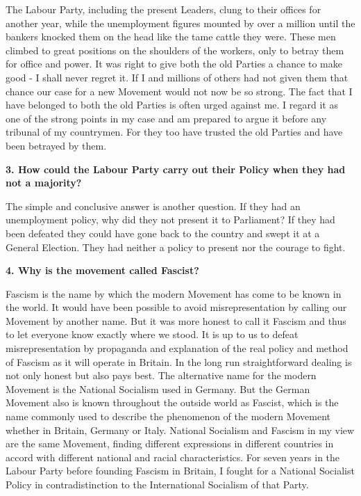 \documentclass{book}
\begin{document}
\begin{flushleft}
The Labour Party, including the present Leaders, clung to their offices for another year, while the
unemployment figures mounted by over a million until the bankers knocked them on the head
like the tame cattle they were. These men climbed to great positions on the shoulders of the
workers, only to betray them for office and power. It was right to give both the old Parties a
chance to make good - I shall never regret it. If I and millions of others had not given them that
chance our case for a new Movement would not now be so strong. The fact that I have belonged
to both the old Parties is often urged against me. I regard it as one of the strong points in my case
and am prepared to argue it before any tribunal of my countrymen. For they too have trusted the old Parties and have been betrayed by them.
\end{flushleft}

\begin{flushright}
\textbf{3. How could the Labour Party carry out their Policy
    when they had not a majority?}

The simple and conclusive answer is another question. If they had an unemployment policy, why
did they not present it to Parliament? If they had been defeated they could have gone back to the
country and swept it at a General Election. They had neither a policy to present nor the courage to fight.
\end{flushright}

\begin{flushleft}
\textbf{4. Why is the movement called Fascist?}

Fascism is the name by which the modern Movement has come to be known in the world. It
would have been possible to avoid misrepresentation by calling our Movement by another name.
But it was more honest to call it Fascism and thus to let everyone know exactly where we stood.
It is up to us to defeat misrepresentation by propaganda and explanation of the real policy and
method of Fascism as it will operate in Britain. In the long run straightforward dealing is not
only honest but also pays best. The alternative name for the modern Movement is the National
Socialism used in Germany. But the German Movement also is known throughout the outside
world as Fascist, which is the name commonly used to describe the phenomenon of the modern
Movement whether in Britain, Germany or Italy. National Socialism and Fascism in my view are
the same Movement, finding different expressions in different countries in accord with different
national and racial characteristics. For seven years in the Labour Party before founding Fascism in Britain, I fought for a National
Socialist Policy in contradistinction to the International Socialism
of that Party.
\end{flushleft}
\end{document}
